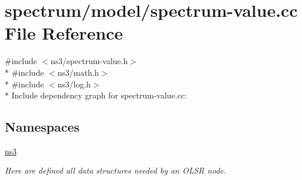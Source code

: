\hypertarget{spectrum-value_8cc}{}\section{spectrum/model/spectrum-\/value.cc File Reference}
\label{spectrum-value_8cc}
{\ttfamily \#include $<$ns3/spectrum-\/value.\+h$>$}\\*
{\ttfamily \#include $<$ns3/math.\+h$>$}\\*
{\ttfamily \#include $<$ns3/log.\+h$>$}\\*
Include dependency graph for spectrum-\/value.cc\+:
\subsection*{Namespaces}
\begin{DoxyCompactItemize}
\item 
 \hyperlink{namespacens3}{ns3}
\begin{DoxyCompactList}\small\item\em Here are defined all data structures needed by an O\+L\+SR node. \end{DoxyCompactList}\end{DoxyCompactItemize}
